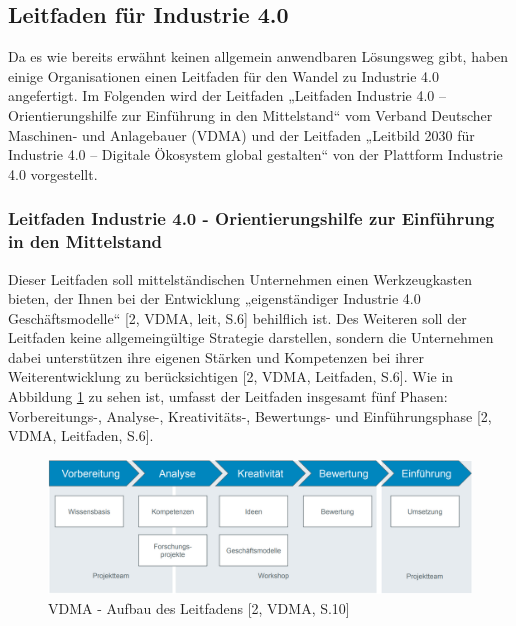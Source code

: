 \subsection{Leitfaden für Industrie 4.0}\label{sec:LeitfadenUmsetung}
Da es wie bereits erwähnt keinen allgemein anwendbaren Lösungsweg gibt, haben einige Organisationen einen Leitfaden für den Wandel zu Industrie 4.0 angefertigt. Im Folgenden wird der Leitfaden „Leitfaden Industrie 4.0 – Orientierungshilfe zur Einführung in den Mittelstand“ vom Verband Deutscher Maschinen- und Anlagebauer (VDMA) und der Leitfaden „Leitbild 2030 für Industrie 4.0 – Digitale Ökosystem global gestalten“ von der Plattform Industrie 4.0 vorgestellt.

\subsubsection{Leitfaden Industrie 4.0 - Orientierungshilfe zur Einführung in den Mittelstand}\label{sec:VDMALeitfaden}
Dieser Leitfaden soll mittelständischen Unternehmen einen Werkzeugkasten bieten, der Ihnen bei der Entwicklung „eigenständiger Industrie 4.0 Geschäftsmodelle“ [2, VDMA, leit, S.6] behilflich ist. Des Weiteren soll der Leitfaden keine allgemeingültige Strategie darstellen, sondern die Unternehmen dabei unterstützen ihre eigenen Stärken und Kompetenzen bei ihrer Weiterentwicklung zu berücksichtigen [2, VDMA, Leitfaden, S.6]. Wie in Abbildung \ref{fig:VDMAAufbauLeitfaden} zu sehen ist, umfasst der Leitfaden insgesamt fünf Phasen: Vorbereitungs-, Analyse-, Kreativitäts-, Bewertungs- und Einführungsphase [2, VDMA, Leitfaden, S.6].
\begin{figure}[h]
	\centering
	\includegraphics[width=1\linewidth]{Bilder/A5_VDMA_Phasen}
	\caption{VDMA - Aufbau des Leitfadens [2, VDMA, S.10]}
	\label{fig:VDMAAufbauLeitfaden}
\end{figure}
